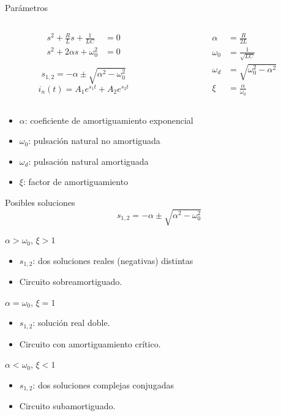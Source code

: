 \documentclass[aspectratio=169, usenames,svgnames,dvipsnames]{beamer}
\begin{document}
\begin{frame}[label={sec:org7ce83fc}]{Parámetros}
\begin{columns}
\begin{column}{.5\columnwidth}
\begin{align*}
  s^2 + \frac{R}{L} s + \frac{1}{LC} &= 0\\
  s^2 + 2\alpha s + \omega_0^2 &= 0  
\end{align*}

\[
  s_{1,2} = -\alpha \pm \sqrt{\alpha^2 - \omega_0^2}
\]
\[
  i_n(t) = A_1 e^{s_1 t} + A_2 e^{s_2 t}
\]
\end{column}
\begin{column}{.5\columnwidth}
\begin{align*}
  \alpha &= \frac{R}{2L}\\
  \omega_0 &= \frac{1}{\sqrt{LC}}\\
  \omega_d &= \sqrt{\omega_0^2 - \alpha^2}\\
  \xi &= \frac{\alpha}{\omega_0}
\end{align*}
\end{column}
\end{columns}
\vspace{1cm}
\begin{itemize}
\item \(\alpha\): coeficiente de amortiguamiento exponencial
\item \(\omega_0\): pulsación natural no amortiguada
\item \(\omega_d\): pulsación natural amortiguada
\item \(\xi\): factor de amortiguamiento
\end{itemize}
\end{frame}
\begin{frame}[label={sec:org79dcdeb}]{Posibles soluciones}
\[
  \boxed{s_{1,2} = -\alpha \pm \sqrt{\alpha^2 - \omega_0^2}}
\]
\begin{block}{\(\alpha > \omega_0\), \(\xi > 1\)}
\begin{itemize}
\item \(s_{1,2}\): dos soluciones reales (negativas) distintas
\item Circuito \alert{sobreamortiguado}.
\end{itemize}
\end{block}
\begin{block}{\(\alpha = \omega_0\), \(\xi = 1\)}
\begin{itemize}
\item \(s_{1,2}\): solución real doble.
\item Circuito con \alert{amortiguamiento crítico}.
\end{itemize}
\end{block}
\begin{block}{\(\alpha < \omega_0\), \(\xi < 1\)}
\begin{itemize}
\item \(s_{1,2}\): dos soluciones complejas conjugadas
\item Circuito \alert{subamortiguado}.
\end{itemize}
\end{block}
\end{frame}
\end{document}
